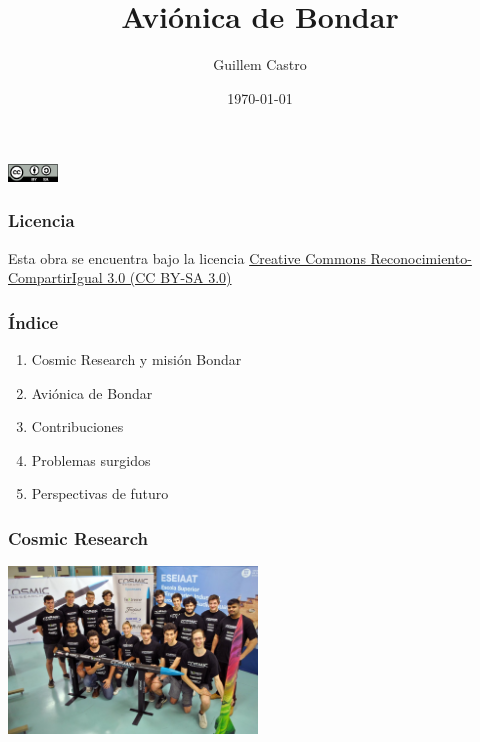 \documentclass[numfooter]{beamer}
\begin{document}
    
    \title{Aviónica de Bondar}
    \author{Guillem Castro}
    \date{\today}

    \begin{frame}
        \maketitle
        \centering
        \includegraphics[width=50px]{images/ccbysa.png}
    \end{frame}

    \begin{frame}
        \frametitle{Licencia}
        Esta obra se encuentra bajo la licencia \href{https://creativecommons.org/licenses/by-sa/3.0/es/}{Creative Commons Reconocimiento-CompartirIgual 3.0 (CC BY-SA 3.0)}

    \end{frame}
    
    \begin{frame}
        \frametitle{Índice}
        \begin{enumerate}
            \item Cosmic Research y misión Bondar
            \item Aviónica de Bondar
            \item Contribuciones
            \item Problemas surgidos
            \item Perspectivas de futuro
        \end{enumerate}
    \end{frame}
    
    \begin{frame}
        \frametitle{Cosmic Research}
        \centering
        \includegraphics[width=250px]{images/cr.jpg}
    \end{frame}
    
\end{document}
